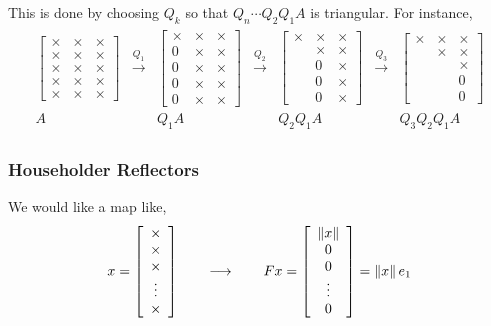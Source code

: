 \documentclass[12pt]{article}
\begin{document}
This is done by choosing \( Q_k \) so that \( Q_n \cdots Q_2Q_1 A \) is triangular. For instance,
\begin{align*}
    \begin{array}{ccccccc}
    \left[\begin{array}{ccc}
    \times & \times & \times \\
    \times & \times & \times \\
    \times & \times & \times \\
    \times & \times & \times \\
    \times & \times & \times
    \end{array}\right]
    &\xrightarrow{Q_1}&
    \left[\begin{array}{ccc}
    \times & \times & \times \\
    0 & \times & \times \\
    0 & \times & \times \\
    0 & \times & \times \\
    0 & \times & \times
    \end{array}\right]
    &\xrightarrow{Q_2}&
    \left[\begin{array}{ccc}
    \times & \times & \times \\
     & \times & \times \\
     & 0 & \times \\
     & 0 & \times \\
     & 0 & \times
    \end{array}\right]
    &\xrightarrow{Q_3}&
    \left[\begin{array}{ccc}
    \times & \times & \times \\
     & \times & \times \\
     &  & \times \\
     &  & 0 \\
     &  & 0
    \end{array}\right]
    \\
    A & & Q_1A & & Q_2Q_1A & & Q_3Q_2Q_1A
\end{array}
\end{align*}

\subsubsection{Householder Reflectors}
We would like a map like,
\begin{align*}
    x = \left[\begin{array}{c}\times \\ \times \\ \times \\ \vdots \\ \times \end{array}\right]
    \hspace{2em}\longrightarrow \hspace{2em}
    Fx = \left[\begin{array}{c}\left\lVert x\right\rVert \\ 0 \\ 0 \\ \vdots \\ 0 \end{array}\right]
    = \left\lVert x\right\rVert e_1
\end{align*}
\end{document}
